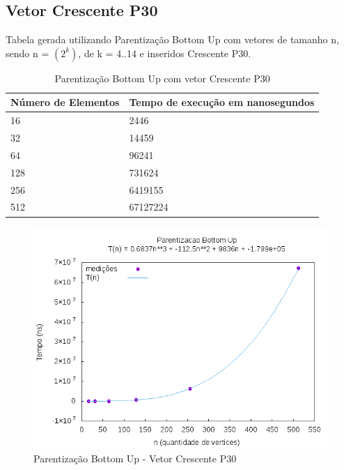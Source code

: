 \documentclass[12pt,a4paper,twoside]{report}
\begin{document}
\subsection{Vetor Crescente P30}
Tabela gerada utilizando Parentização Bottom Up com vetores de tamanho n, sendo n = $(2^k)$, de k = 4..14 e inseridos Crescente P30.
\begin{table}[H]
\centering
\caption{Parentização Bottom Up com vetor Crescente P30}
\label{my-label}
\begin{tabular}{|l|l|}
\hline
\multicolumn{1}{|c|}{\textbf{Número de Elementos}} & \multicolumn{1}{c|}{\textbf{Tempo de execução em nanosegundos}} \\ \hline
16 & 2446 \\ \hline
32 & 14459 \\ \hline
64 & 96241 \\ \hline
128 & 731624 \\ \hline
256 & 6419155 \\ \hline
512 & 67127224 \\ \hline
\end{tabular}
\end{table}

\begin{figure}[H]
    \centering
    \includegraphics[width=0.7\linewidth]{graficos/Parentizacao BottomUp/Crescente P30/ParentizacaoBottomUp.png}
  \caption{Parentização Bottom Up - Vetor Crescente P30}
\end{figure}
\end{document}
